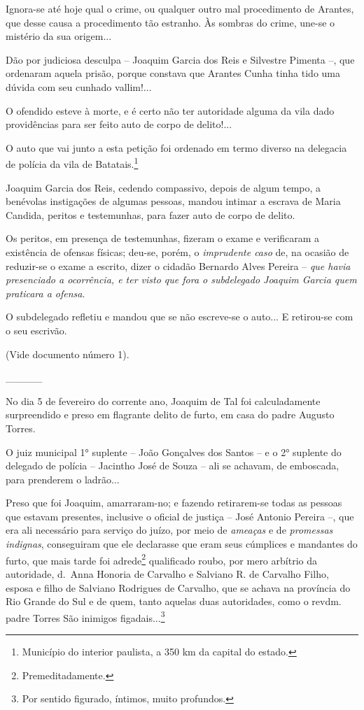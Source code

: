 Ignora-se até hoje qual o crime, ou qualquer outro mal procedimento de
Arantes, que desse causa a procedimento tão estranho. Às sombras do
crime, une-se o mistério da sua origem...

Dão por judiciosa desculpa -- Joaquim Garcia dos Reis e Silvestre
Pimenta --, que ordenaram aquela prisão, porque constava que Arantes
Cunha tinha tido uma dúvida com seu cunhado vallim!...

O ofendido esteve à morte, e é certo não ter autoridade alguma da vila
dado providências para ser feito auto de corpo de delito!...

O auto que vai junto a esta petição foi ordenado em termo diverso na
delegacia de polícia da vila de Batatais.\footnote{ Município do
  interior paulista, a 350 km da capital do estado.}

Joaquim Garcia dos Reis, cedendo compassivo, depois de algum tempo, a
benévolas instigações de algumas pessoas, mandou intimar a escrava de
Maria Candida, peritos e testemunhas, para fazer auto de corpo de
delito.

Os peritos, em presença de testemunhas, fizeram o exame e verificaram a
existência de ofensas físicas; deu-se, porém, o \emph{imprudente caso}
de, na ocasião de reduzir-se o exame a escrito, dizer o cidadão Bernardo
Alves Pereira -- \emph{que havia presenciado a ocorrência, e ter visto
que fora o subdelegado Joaquim Garcia quem praticara a ofensa}.

O subdelegado refletiu e mandou que se não escreve-se o auto... E
retirou-se com o seu escrivão.

(Vide documento número 1).

\_\_\_\_\_

No dia 5 de fevereiro do corrente ano, Joaquim de Tal foi calculadamente
surpreendido e preso em flagrante delito de furto, em casa do padre
Augusto Torres.

O juiz municipal 1° suplente -- João Gonçalves dos Santos -- e o 2°
suplente do delegado de polícia -- Jacintho José de Souza -- ali se
achavam, de emboscada, para prenderem o ladrão...

Preso que foi Joaquim, amarraram-no; e fazendo retirarem-se todas as
pessoas que estavam presentes, inclusive o oficial de justiça -- José
Antonio Pereira --, que era ali necessário para serviço do juízo, por
meio de \emph{ameaças} e de \emph{promessas indignas}, conseguiram que
ele declarasse que eram seus cúmplices e mandantes do furto, que mais
tarde foi adrede\footnote{ Premeditadamente.} qualificado roubo, por
mero arbítrio da autoridade, d.~Anna Honoria de Carvalho e Salviano R.
de Carvalho Filho, esposa e filho de Salviano Rodrigues de Carvalho, que
se achava na província do Rio Grande do Sul e de quem, tanto aquelas
duas autoridades, como o revdm. padre Torres São inimigos
figadais...\footnote{ Por sentido figurado, íntimos, muito profundos.}

